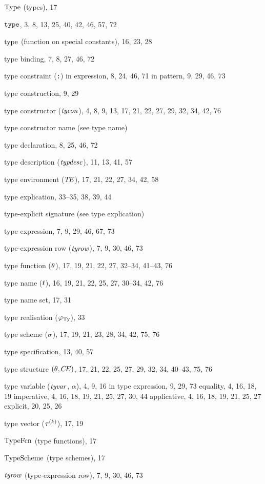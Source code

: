 \begin{theindex}
\item ${\rm Type}$ (types), 17
\item ${\tt type}$, 3, 8, 13, 25, 40, 42, 46, 57, 72
\item $\mathop{\rm type}\nolimits$ (function on special constants), 16, 23, 28
\item type binding, 7, 8, 27, 46, 72
\item type constraint (\verb+:+) 
\subitem in expression, 8, 24, 46, 71
\subitem in pattern, 9, 29, 46, 73
\item type construction, 9, 29
\item type constructor (${\it tycon}$), 4, 8, 9, 13, 17, 21, 22, 27, 29, 32, 34, 42, 76
\item type constructor name (see type name) 
\item type declaration, 8, 25, 46, 72
\item type description (${\it typdesc}$), 11, 13, 41, 57
\item type environment ($\mbox{$T\!E$}$), 17, 21, 22, 27, 34, 42, 58
\item type explication, 33--35, 38, 39, 44
\item type-explicit signature (see type explication) 
\item type expression, 7, 9, 29, 46, 67, 73
\item type-expression row (${\it tyrow}$), 7, 9, 30, 46, 73
\item type function ($\theta$), 17, 19, 21, 22, 27, 32--34, 41--43, 76
\item type name ($t$), 16, 19, 21, 22, 25, 27, 30--34, 42, 76
\item type name set, 17, 31
\item type realisation ($\varphi_{\rm Ty}$), 33
\item type scheme ($\sigma$), 17, 19, 21, 23, 28, 34, 42, 75, 76
\item type specification, 13, 40, 57
\item type structure $(\theta,\mbox{$C\!E$})$, 17, 21, 22, 25, 27, 29, 32, 34, 40--43, 75, 76
\item type variable (${\it tyvar}$, $\alpha$), 4, 9, 16
\subitem in type expression, 9, 29, 73
\subitem equality, 4, 16, 18, 19
\subitem imperative, 4, 16, 18, 19, 21, 25, 27, 30, 44
\subitem applicative, 4, 16, 18, 19, 21, 25, 27
\subitem explicit, 20, 25, 26
\item type vector ($\mbox{$\tau^{(k)}$}$), 17, 19
\item ${\rm TypeFcn}$ (type functions), 17
\item ${\rm TypeScheme}$ (type schemes), 17
\item ${\it tyrow}$ (type-expression row), 7, 9, 30, 46, 73

\end{theindex}
